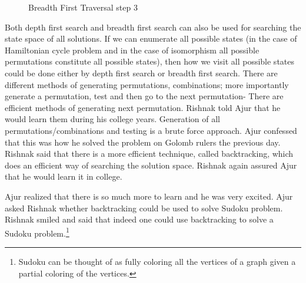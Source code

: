 \begin{figure}
\begin{center}
\caption{ Breadth First Traversal step 3}\label{20g10}
\end{center}
\end{figure}

Both depth first search and breadth first search can also be used for searching the state space of all solutions. If we can enumerate all possible states (in the case of Hamiltonian cycle problem and in the case of isomorphism all possible permutations constitute all possible states), then how we visit all possible states could be done either by depth first search or breadth first search.
There are different methods of generating permutations, combinations; more importantly generate a permutation, test and then go to the next permutation- There are efficient methods of generating next permutation. Rishnak told Ajur that he would learn them during his college years.
Generation of all permutations/combinations and testing is a brute force approach. Ajur confessed that this was how he solved the problem on Golomb rulers the previous day. Rishnak said that there is a more efficient technique, called backtracking, which does an efficient way of searching the solution space. Rishnak again assured Ajur that he would learn it in college.

Ajur realized that there is so much more to learn and he was very excited. Ajur asked Rishnak whether backtracking could be used to solve Sudoku problem. Rishnak smiled and said that indeed one could use backtracking to solve a Sudoku problem.\footnote{Sudoku can be thought of as fully coloring all the vertices of a graph given a partial coloring of the vertices.}

